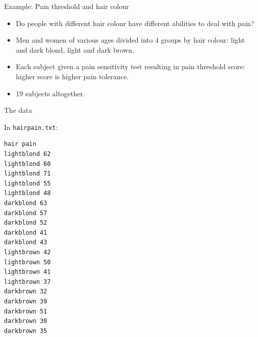 \documentclass[
  ignorenonframetext,
]{beamer}
\begin{document}
\begin{frame}{Example: Pain threshold and hair colour}
\protect\hypertarget{example-pain-threshold-and-hair-colour}{}

\begin{itemize}
\item
  Do people with different hair colour have different abilities to deal
  with pain?
\item
  Men and women of various ages divided into 4 groups by hair colour:
  light and dark blond, light and dark brown.
\item
  Each subject given a pain sensitivity test resulting in pain threshold
  score: higher score is higher pain tolerance.
\item
  19 subjects altogether.
\end{itemize}

\end{frame}

\begin{frame}[fragile]{The data}
\protect\hypertarget{the-data-6}{}

In \texttt{hairpain.txt}:

\begin{multicols}{2}

\begin{verbatim}
hair pain
lightblond 62
lightblond 60
lightblond 71
lightblond 55
lightblond 48
darkblond 63
darkblond 57
darkblond 52
darkblond 41
darkblond 43
lightbrown 42
lightbrown 50
lightbrown 41
lightbrown 37
darkbrown 32
darkbrown 39
darkbrown 51
darkbrown 30
darkbrown 35
\end{verbatim}

\end{multicols}

\end{frame}
\end{document}

